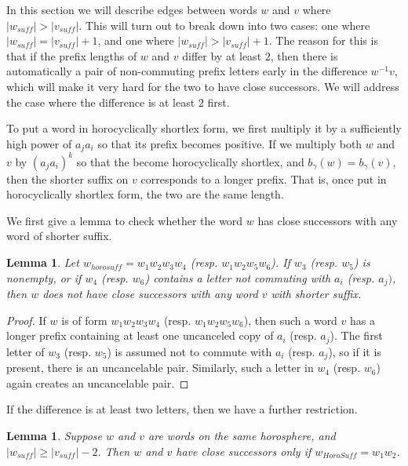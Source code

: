 \documentclass{amsart}
\newtheorem{lemma}[theorem]{Lemma}
\theoremstyle{definition}
\theoremstyle{remark}
\begin{document}
	In this section we will describe edges between words $w$ and $v$  where $|w_{suff}|>|v_{suff}|$. This will turn out to break down into two cases: one where $|w_{suff}|=|v_{suff}|+1$, and one where $|w_{suff}|>|v_{suff}|+1$. The reason for this is that if the prefix lengths of $w$ and $v$ differ by at least $2$, then there is automatically a pair of non-commuting prefix letters early in the difference $w^{-1}v$, which will make it very hard for the two to have close successors. We will address the case where the difference is at least $2$ first. 
	
	To put a word in horocyclically shortlex form, we first multiply it by a sufficiently high power of $a_ja_i$ so that its prefix becomes positive. If we multiply both $w$ and $v$ by $(a_ja_i)^k$ so that the become horocyclically shortlex, and $b_\gamma(w)=b_\gamma(v)$, then the shorter suffix on $v$ corresponds to a longer prefix. That is, once put in horocyclically shortlex form, the two are the same length.
	
	We first give a lemma to check whether the word $w$ has close successors with any word of shorter suffix.
	
	\begin{lemma}
		
		Let $w_{horosuff} = w_1w_2w_3w_4$ (resp. $w_1w_2w_5w_6$). If $w_3$ (resp. $w_5$) is nonempty, or if $w_4$ (resp. $w_6$) contains a letter not commuting with $a_i$ (resp. $a_j)$, then $w$ does not have close successors with any word $v$ with shorter suffix.
		
	\end{lemma}
	
	\begin{proof}
		
		If $w$ is of form $w_1w_2w_3w_4$ (resp. $w_1w_2w_5w_6$), then such a word $v$ has a longer prefix containing at least one uncanceled copy of $a_i$ (resp. $a_j$). The first letter of $w_3$ (resp. $w_5$) is assumed not to commute with $a_i$ (resp. $a_j$), so if it is present, there is an uncancelable pair. Similarly, such a letter in $w_4$ (resp. $w_6$) again creates an uncancelable pair. 	
	\end{proof}
	
	If the difference is at least two letters, then we have a further restriction.
	
	\begin{lemma}
		
		Suppose $w$ and $v$ are words on the same horosphere, and \newline $|w_{suff}|\ge |v_{suff}|-2$. Then $w$ and $v$ have close successors only if $w_{HoroSuff}=w_1w_2$.
		
	\end{lemma}
	
\end{document}
